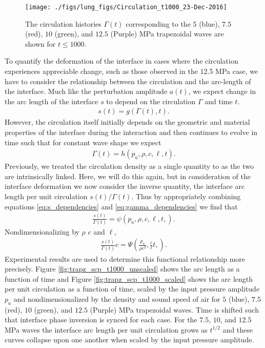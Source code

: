 \documentclass{jfm}%
\begin{document}
%
\begin{figure}
  \centering
  \texttt{[image: ./figs/lung\_figs/Circulation\_t1000\_23-Dec-2016]}
  \caption[The circulation long time]{The circulation histories
    $\Gamma(t)$ corresponding to the $5$ (blue), $7.5$ (red), $10$
    (green), and $12.5$ (Purple) MPa trapezoidal waves are shown for
    $t\leq 1000$. }
  \label{fig:trapz_circ_t1000}
\end{figure}
%
To quantify the deformation of the interface in cases where the
circulation experiences appreciable change, such as those observed in
the 12.5 MPa case, we have to consider the relationship between the
circulation and the arc-length of the interface. Much like the
perturbation amplitude $a(t)$, we expect change in the arc length of
the interface $s$ to depend on the circulation $\Gamma$ and time
$t$.
%
\begin{align}
  \label{eq:s_dependencies}%
  s(t) = g\left(\Gamma(t), t \right).%
\end{align}%
%
However, the circulation itself initially depends on the geometric and
material properties of the interface during the interaction and then
continues to evolve in time such that for constant wave shape we
expect
%
\begin{align}%
  \label{eq:gamma_dependencies}%
  \Gamma(t) = h\left(p_a, \rho, c, \ell, t\right).%
\end{align}%
%
Previously, we treated the circulation density as a single quantity to
as the two are intrinsically linked. Here, we will do this again, but
in consideration of the interface deformation we now consider the
inverse quantity, the interface arc length per unit circulation
$s(t)/\Gamma(t)$. Thus by appropriately combining equations
\eqref{eq:s_dependencies} and \eqref{eq:gamma_dependencies} we find
that
%
\begin{align}%
  \label{eq:scp_dependencies}%
  \frac{s(t)}{\Gamma(t)} = \psi\left(p_a,\rho, c, \ell, t,\right).
\end{align}%
%
Nondimensionalizing by $\rho$ $c$ and $\ell$,
%
\begin{align}%
  \label{eq:scp_dimensionless}%
  \frac{s(t)}{\Gamma(t)} c = \Psi\left(\frac{p_a}{\rho c^2},\frac{c}{\ell}t,\right).%
\end{align}%
%
Experimental results are used to determine this functional
relationship more precisely. Figure \ref{fig:trapz_scp_t1000_unscaled}
shows the arc length as a function of time and Figure
\ref{fig:trapz_scp_t1000_scaled} shows the arc length per unit
circulation as a function of time, scaled by the input pressure
amplitude $p_a$ and nondimensionalized by the density and sound speed
of air for $5$ (blue), $7.5$ (red), $10$ (green), and $12.5$ (Purple)
MPa trapezoidal waves. Time is shifted such that interface phase
inversion is synced for each case. For the $7.5$, $10$, and $12.5$ MPa
waves the interface arc length per unit circulation grows as $t^{1/2}$
and these curves collapse upon one another when scaled by the input
pressure amplitude.
\end{document}
